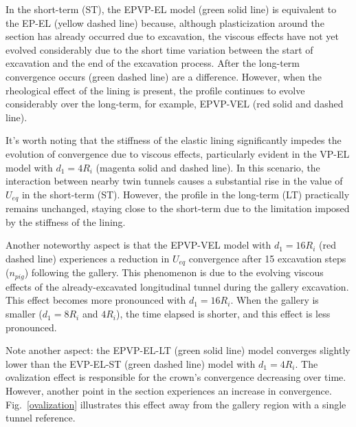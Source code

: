\documentclass[a4paper,fleqn]{cas-sc}
\begin{document}
In the short-term (ST), the EPVP-EL model (green solid line) is equivalent to the EP-EL (yellow dashed line) because, although plasticization around the section has already occurred due to excavation, the viscous effects have not yet evolved considerably due to the short time variation between the start of excavation and the end of the excavation process. After the long-term convergence occurs (green dashed line) are a difference. However, when the rheological effect of the lining is present, the profile continues to evolve considerably over the long-term, for example, EPVP-VEL (red solid and dashed line).

It's worth noting that the stiffness of the elastic lining significantly impedes the evolution of convergence due to viscous effects, particularly evident in the VP-EL model with $d_1=4R_i$ (magenta solid and dashed line). In this scenario, the interaction between nearby twin tunnels causes a substantial rise in the value of $U_{eq}$ in the short-term (ST). However, the profile in the long-term (LT) practically remains unchanged, staying close to the short-term due to the limitation imposed by the stiffness of the lining.

Another noteworthy aspect is that the EPVP-VEL model with $d_1 = 16R_i$ (red dashed line) experiences a reduction in $U_{eq}$ convergence after 15 excavation steps ($n_{pig}$) following the gallery. This phenomenon is due to the evolving viscous effects of the already-excavated longitudinal tunnel during the gallery excavation. This effect becomes more pronounced with $d_1 = 16R_i$. When the gallery is smaller ($d_1 = 8R_i$ and $4R_i$), the time elapsed is shorter, and this effect is less pronounced.

Note another aspect: the EPVP-EL-LT (green solid line) model converges slightly lower than the EVP-EL-ST (green dashed line) model with $d_1 = 4R_i$. The ovalization effect is responsible for the crown's convergence decreasing over time. However, another point in the section experiences an increase in convergence. Fig.~\ref{ovalization} illustrates this effect away from the gallery region with a single tunnel reference.
\end{document}
